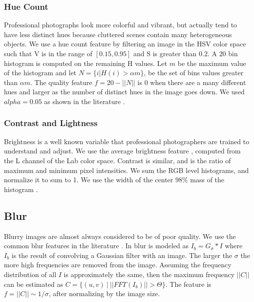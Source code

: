 \documentclass[conference,a4paper]{IEEEtran}
\begin{document}
  \subsubsection{Hue Count}
  Professional photographs look more colorful and vibrant, but actually tend to have less distinct hues because cluttered scenes contain many heterogeneous objects.  We use a hue count feature by filtering an image in the HSV color space such that V is in the range of $[0.15, 0.95]$ and S is greater than $0.2$.  A $20$ bin histogram is computed on the remaining H values.  Let $m$ be the maximum value of the histogram and let $N = \{i | H(i) > \alpha m\}$, be the set of bins values greater than $\alpha m$.  The quality feature $f = 20 - ||N||$ is $0$ when there are a many different hues and larger as the number of distinct hues in the image goes down.  We used $alpha = 0.05$ as shown in the literature \cite{ke2006design}.

  \subsubsection{Contrast and Lightness}
  Brightness is a well known variable that professional photographers are trained to understand and adjust.  We use the average brightness feature \cite{ke2006design}, \cite{chen2014aesthetic} computed from the L channel of the Lab color space.  Contrast is similar, and is the ratio of maximum and minimum pixel intensities.  We sum the RGB level histograms, and normalize it to sum to 1.  We use the width of the center $98\%$ mass of the histogram \cite{ke2006design}.

   \subsection{Blur}
  Blurry images are almost always considered to be of poor quality.  We use the common blur features in the literature \cite{ke2006design} \cite{tong2004blur}.  In \cite{ke2006design} blur is modeled as $I_b = G_\sigma * I$ where $I_b$ is the result of convolving a Gaussian filter with an image.  The larger the $\sigma$ the more high frequencies are removed from the image.  Assuming the frequency distribution of all $I$ is approximately the same, then the maximum frequency $||C||$ can be estimated as $C = \{(u, v)\ |\ ||FFT(I_b)|| > \Theta\}$.  The feature is $f = ||C|| \sim 1/\sigma$, after normalizing by the image size.
\end{document}
